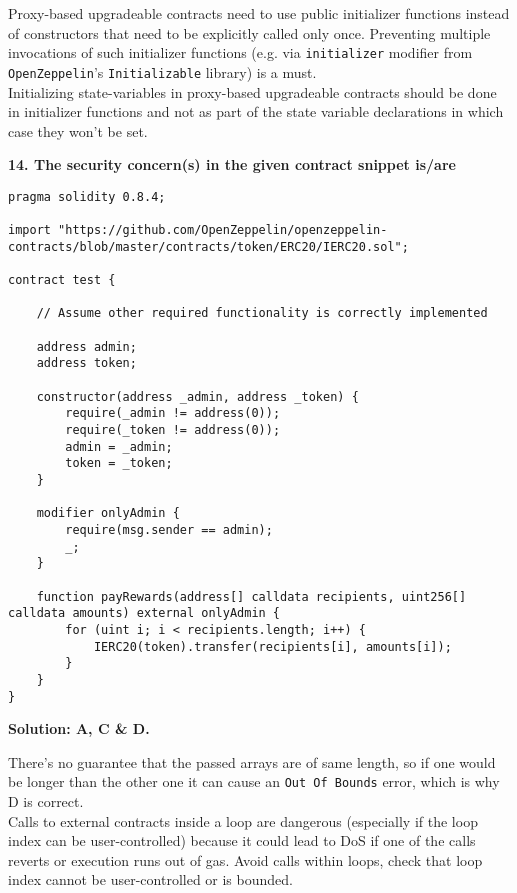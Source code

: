 Proxy-based upgradeable contracts need to use public initializer functions instead of constructors that need to be explicitly called only once.
Preventing multiple invocations of such initializer functions (e.g. via \verb|initializer| modifier from \verb|OpenZeppelin|'s \verb|Initializable| library) is a must.\\

Initializing state-variables in proxy-based upgradeable contracts should be done in initializer functions and not as part of the state variable declarations in which case they won’t be set.\\

\pagebreak

\textbf{14. The security concern(s) in the given contract snippet is/are}\label{sec:exam4_q14}\\

\begin{lstlisting}[language=Solidity, style=solStyle]
pragma solidity 0.8.4;

import "https://github.com/OpenZeppelin/openzeppelin-contracts/blob/master/contracts/token/ERC20/IERC20.sol";

contract test {

    // Assume other required functionality is correctly implemented

    address admin;
    address token;

    constructor(address _admin, address _token) {
        require(_admin != address(0));
        require(_token != address(0));
        admin = _admin;
        token = _token;
    }

    modifier onlyAdmin {
        require(msg.sender == admin);
        _;
    }

    function payRewards(address[] calldata recipients, uint256[] calldata amounts) external onlyAdmin {
        for (uint i; i < recipients.length; i++) {
            IERC20(token).transfer(recipients[i], amounts[i]);
        }
    }
}
\end{lstlisting}

\textbf{Solution: A, C \& D.}

There's no guarantee that the passed arrays are of same length, so if one would be longer than the other one it can cause an \verb|Out Of Bounds| error, which is why D is correct.\\

Calls to external contracts inside a loop are dangerous (especially if the loop index can be user-controlled) because it could lead to DoS if one of the calls reverts or execution runs out of gas.
Avoid calls within loops, check that loop index cannot be user-controlled or is bounded.\\

